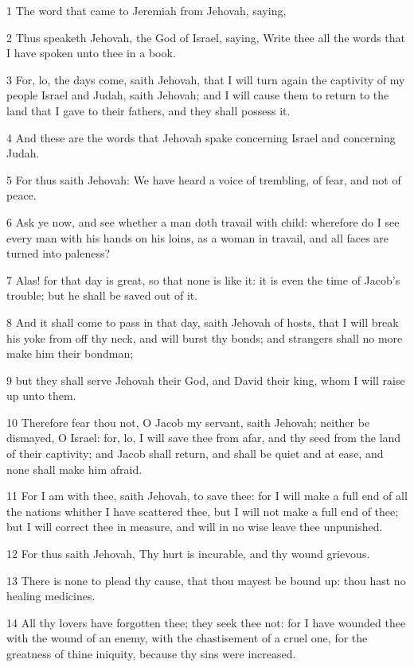 \par 1 The word that came to Jeremiah from Jehovah, saying,
\par 2 Thus speaketh Jehovah, the God of Israel, saying, Write thee all the words that I have spoken unto thee in a book.
\par 3 For, lo, the days come, saith Jehovah, that I will turn again the captivity of my people Israel and Judah, saith Jehovah; and I will cause them to return to the land that I gave to their fathers, and they shall possess it.
\par 4 And these are the words that Jehovah spake concerning Israel and concerning Judah.
\par 5 For thus saith Jehovah: We have heard a voice of trembling, of fear, and not of peace.
\par 6 Ask ye now, and see whether a man doth travail with child: wherefore do I see every man with his hands on his loins, as a woman in travail, and all faces are turned into paleness?
\par 7 Alas! for that day is great, so that none is like it: it is even the time of Jacob's trouble; but he shall be saved out of it.
\par 8 And it shall come to pass in that day, saith Jehovah of hosts, that I will break his yoke from off thy neck, and will burst thy bonds; and strangers shall no more make him their bondman;
\par 9 but they shall serve Jehovah their God, and David their king, whom I will raise up unto them.
\par 10 Therefore fear thou not, O Jacob my servant, saith Jehovah; neither be dismayed, O Israel: for, lo, I will save thee from afar, and thy seed from the land of their captivity; and Jacob shall return, and shall be quiet and at ease, and none shall make him afraid.
\par 11 For I am with thee, saith Jehovah, to save thee: for I will make a full end of all the nations whither I have scattered thee, but I will not make a full end of thee; but I will correct thee in measure, and will in no wise leave thee unpunished.
\par 12 For thus saith Jehovah, Thy hurt is incurable, and thy wound grievous.
\par 13 There is none to plead thy cause, that thou mayest be bound up: thou hast no healing medicines.
\par 14 All thy lovers have forgotten thee; they seek thee not: for I have wounded thee with the wound of an enemy, with the chastisement of a cruel one, for the greatness of thine iniquity, because thy sins were increased.
